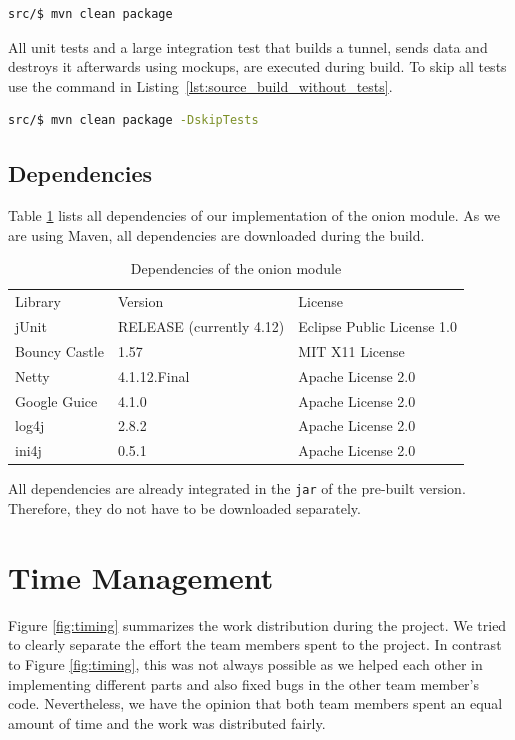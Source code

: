 \documentclass[paper=letter, fontsize=12pt]{article}
\begin{document}
\begin{lstlisting}[language=bash, caption=Build the project from source, label=lst:source_build]
src/$ mvn clean package
\end{lstlisting}

All unit tests and a large integration test that builds a tunnel, sends data and destroys it afterwards using mockups, are executed during build.
To skip all tests use the command in Listing~\ref{lst:source_build_without_tests}.

\begin{lstlisting}[language=bash, caption=Build the project from source without tests, label=lst:source_build_without_tests]
src/$ mvn clean package -DskipTests
\end{lstlisting}


\subsection{Dependencies}
Table \ref{tab:dependencies} lists all dependencies of our implementation of the onion module.
As we are using Maven, all dependencies are downloaded during the build.

\begin{table}[H]
    \centering
    \caption{Dependencies of the onion module}
    \label{tab:dependencies}
    \begin{tabular}{l|l|l}
        Library         & Version                   & License \\ \Xhline{3\arrayrulewidth}
        jUnit           & RELEASE (currently 4.12)  & Eclipse Public License 1.0 \\
        Bouncy Castle   & 1.57                      & MIT X11 License \\
        Netty           & 4.1.12.Final              & Apache License 2.0 \\
        Google Guice    & 4.1.0                     & Apache License 2.0 \\
        log4j           & 2.8.2                     & Apache License 2.0 \\
        ini4j           & 0.5.1                     & Apache License 2.0
    \end{tabular}
\end{table}

All dependencies are already integrated in the \texttt{jar} of the pre-built version.
Therefore, they do not have to be downloaded separately.

\section{Time Management}
Figure \ref{fig:timing} summarizes the work distribution during the project.
We tried to clearly separate the effort the team members spent to the project.
In contrast to Figure \ref{fig:timing}, this was not always possible as we helped each other in implementing different parts and also fixed bugs in the other team member's code.
Nevertheless, we have the opinion that both team members spent an equal amount of time and the work was distributed fairly.
\end{document}
